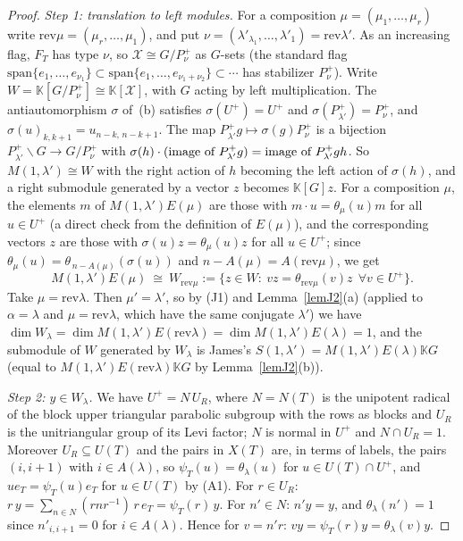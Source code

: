 \documentclass[11pt, letterpaper]{amsart}
\let\amstext\text
\renewcommand{\text}[1]{\amstext{\upshape #1}}%
\theoremstyle{definition}
\theoremstyle{remark}
\newcommand{\KK}{\mathbb{K}}
\newcommand{\rev}{\mathrm{rev}}
\begin{document}
\begin{proof}
\emph{Step 1: translation to left modules.} For a composition $\mu=(\mu_1,\dots,\mu_r)$ write $\rev\mu=(\mu_r,\dots,\mu_1)$, and put $\nu=(\lambda'_{\lambda_1},\dots,\lambda'_1)=\rev\lambda'$. As an increasing flag, $F_T$ has type $\nu$, so $\mathcal X\cong G/P^+_\nu$ as $G$-sets (the standard flag $\mathrm{span}\{e_1,\dots,e_{\nu_1}\}\subset\mathrm{span}\{e_1,\dots,e_{\nu_1+\nu_2}\}\subset\cdots$ has stabilizer $P^+_\nu$). Write $W=\KK[G/P^+_\nu]\cong\KK[\mathcal X]$, with $G$ acting by left multiplication. The antiautomorphism $\sigma$ of~(b) satisfies $\sigma(U^+)=U^+$ and $\sigma(P^+_{\lambda'})=P^+_\nu$, and $\sigma(u)_{k,k+1}=u_{n-k,\,n-k+1}$. The map $P^+_{\lambda'}g\mapsto\sigma(g)P^+_\nu$ is a bijection $P^+_{\lambda'}\backslash G\to G/P^+_\nu$ with $\sigma(h)\cdot(\text{image of }P^+_{\lambda'}g)=\text{image of }P^+_{\lambda'}gh$. So $M(1,\lambda')\cong W$ with the right action of $h$ becoming the left action of $\sigma(h)$, and a right submodule generated by a vector $z$ becomes $\KK[G]z$. For a composition $\mu$, the elements $m$ of $M(1,\lambda')E(\mu)$ are those with $m\cdot u=\theta_\mu(u)m$ for all $u\in U^+$ (a direct check from the definition of $E(\mu)$), and the corresponding vectors $z$ are those with $\sigma(u)z=\theta_\mu(u)z$ for all $u\in U^+$; since $\theta_\mu(u)=\theta_{\,n-A(\mu)}(\sigma(u))$ and $n-A(\mu)=A(\rev\mu)$, we get
\[
M(1,\lambda')E(\mu)\ \cong\ W_{\rev\mu}:=\{z\in W:\ vz=\theta_{\rev\mu}(v)z\ \ \forall v\in U^+\}.
\]
Take $\mu=\rev\lambda$. Then $\mu'=\lambda'$, so by (J1) and Lemma~\ref{lemJ2}(a) (applied to $\alpha=\lambda$ and $\mu=\rev\lambda$, which have the same conjugate $\lambda'$) we have $\dim W_\lambda=\dim M(1,\lambda')E(\rev\lambda)=\dim M(1,\lambda')E(\lambda)=1$, and the submodule of $W$ generated by $W_\lambda$ is James's $S(1,\lambda')=M(1,\lambda')E(\lambda)\KK G$ (equal to $M(1,\lambda')E(\rev\lambda)\KK G$ by Lemma~\ref{lemJ2}(b)).

\emph{Step 2: $y\in W_\lambda$.} We have $U^+=N\,U_R$, where $N=N(T)$ is the unipotent radical of the block upper triangular parabolic subgroup with the rows as blocks and $U_R$ is the unitriangular group of its Levi factor; $N$ is normal in $U^+$ and $N\cap U_R=1$. Moreover $U_R\subseteq U(T)$ and the pairs in $X(T)$ are, in terms of labels, the pairs $(i,i+1)$ with $i\in A(\lambda)$, so $\psi_T(u)=\theta_\lambda(u)$ for $u\in U(T)\cap U^+$, and $ue_T=\psi_T(u)e_T$ for $u\in U(T)$ by (A1). For $r\in U_R$: $r\,y=\sum_{n\in N}(rnr^{-1})\,r\,e_T=\psi_T(r)\,y$. For $n'\in N$: $n'y=y$, and $\theta_\lambda(n')=1$ since $n'_{i,i+1}=0$ for $i\in A(\lambda)$. Hence for $v=n'r$: $vy=\psi_T(r)y=\theta_\lambda(v)y$.


\end{proof}
\end{document}
